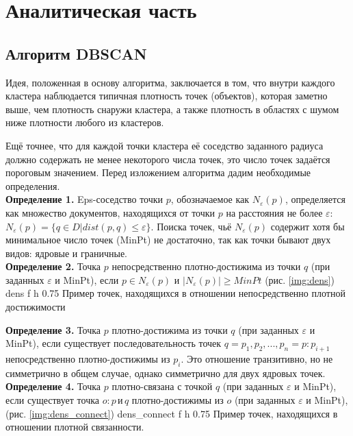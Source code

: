 \chapter{Аналитическая часть}

\section{Алгоритм DBSCAN}
Идея, положенная в основу алгоритма, заключается в том, что внутри каждого кластера наблюдается типичная плотность точек (объектов), которая заметно выше, чем плотность снаружи кластера, а также плотность в областях с шумом ниже плотности любого из кластеров.\cite{serial} 

Ещё точнее, что для каждой точки кластера её соседство заданного радиуса должно содержать не менее некоторого числа точек, это число точек задаётся пороговым значением. 
Перед изложением алгоритма дадим необходимые определения.\\

\textbf{Определение 1.} Eps-соседство точки \(p\), обозначаемое как \(N_{\varepsilon}(p)\), определяется как множество документов, находящихся от точки \(p\) на расстояния не более \(\varepsilon\): 
\(N_{\varepsilon}(p) = \{ q \in D | dist(p, q) \le \varepsilon \}\). Поиска точек, чьё \(N_{\varepsilon}(p)\) содержит хотя бы минимальное число точек (MinPt) не достаточно, так как точки бывают двух видов: 
ядровые и граничные.\\
\indent\textbf{Определение 2.} Точка \(p\) непосредственно плотно-достижима из точки \(q\) (при заданных \(\varepsilon\) и MinPt), если \( p \in N_{\varepsilon}(p) \) и \(|N_{\varepsilon}(p)| \ge MinPt \) (рис. \ref{img:dens}) 
{dens} %
{f} %
{h} %
{0.75\textwidth} %
{Пример точек, находящихся в отношении непосредственно плотной достижимости} %

\textbf{Определение 3.} Точка \(p\) плотно-достижима из точки \(q\) (при заданных \(\varepsilon\) и MinPt), если существует последовательность точек \(q = p_1, p_2, ... , p_n = p: p_{i+1}\) непосредственно плотно-достижимы из \(p_i\). 
Это отношение транзитивно, но не симметрично в общем случае, однако симметрично для двух ядровых точек.\\ 
\clearpage
\indent\textbf{Определение 4.} Точка \(p\) плотно-связана с точкой \(q\) (при заданных \(\varepsilon\) и MinPt), если существует точка \(o: p\, \text{и}\, q\) плотно-достижимы из \(o\) (при заданных \(\varepsilon\) и MinPt), (рис. \ref{img:dens_connect})
{dens_connect} %
{f} %
{h} %
{0.75\textwidth} %
{Пример точек, находящихся в отношении плотной связанности.} %

